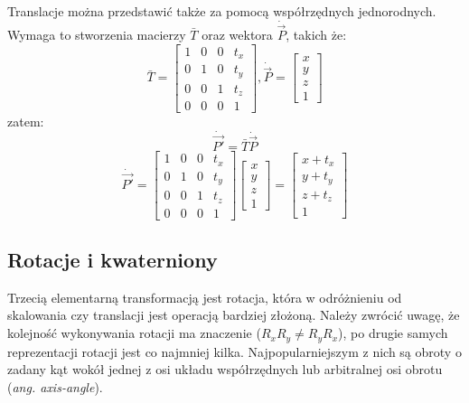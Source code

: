 \documentclass[licencjacka]{pracamgr}
\begin{document}
Translacje można przedstawić także za pomocą współrzędnych jednorodnych. Wymaga to stworzenia macierzy $\bar{T}$ oraz wektora $\dot{\vec{P}}$, takich że:
$$
\bar{T}
=
\begin{bmatrix}
1 & 0 & 0 & t_x \\
0 & 1 & 0 & t_y \\
0 & 0 & 1 & t_z \\
0 & 0 & 0 & 1
\end{bmatrix}
,
\dot{\vec{P}}
=
\begin{bmatrix}
x \\
y \\
z \\
1
\end{bmatrix}
$$
zatem:
$$
\dot{\vec{P'}}=\bar{T} \dot{\vec{P}}
$$
$$
\dot{\vec{P'}}=
\begin{bmatrix}
1 & 0 & 0 & t_x \\
0 & 1 & 0 & t_y \\
0 & 0 & 1 & t_z \\
0 & 0 & 0 & 1
\end{bmatrix}
\begin{bmatrix}
x \\
y \\
z \\
1
\end{bmatrix}
=
\begin{bmatrix}
x+t_x \\
y+t_y \\
z+t_z \\
1
\end{bmatrix}
$$
\subsection{Rotacje i kwaterniony}
Trzecią elementarną transformacją jest rotacja, która w odróżnieniu od skalowania czy translacji jest operacją bardziej złożoną. Należy zwrócić uwagę, że kolejność wykonywania rotacji ma znaczenie ($R_xR_y\neq R_yR_x$), po drugie samych reprezentacji rotacji jest co najmniej kilka. Najpopularniejszym z nich są obroty o zadany kąt wokół jednej z osi układu współrzędnych lub arbitralnej osi obrotu (\textit{ang. axis-angle}).
\end{document}
